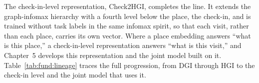 The check-in-level representation, Check2HGI, completes the line. It extends the
graph-infomax hierarchy with a fourth level below the place, the check-in, and is
trained without task labels in the same infomax spirit, so that each visit, rather
than each place, carries its own vector. Where a place embedding answers ``what is
this place,'' a check-in-level representation answers ``what is this visit,'' and
Chapter~5 develops this representation and the joint model built on it.
Table~\ref{tab:fund:lineage} traces the full progression, from DGI through HGI to the
check-in level and the joint model that uses it.

